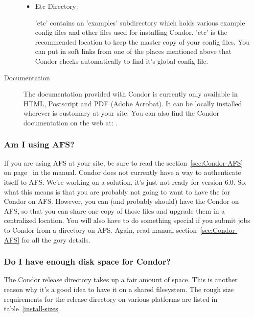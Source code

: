 \begin{description}
\begin{itemize}
     \item Etc Directory:

     'etc' contains an 'examples' subdirectory which holds various
     example config files and other files used for installing Condor.
     'etc' is the recommended location to keep the master copy of your
     config files.  You can put in soft links from one of the places
     mentioned above that Condor checks automatically to find it's
     global config file. 
\end{itemize}

\item[Documentation]

The documentation provided with Condor is currently only available in
HTML, Postscript and PDF (Adobe Acrobat).  It can be locally installed
wherever is customary at your site.  You can also find the Condor
documentation on the web at:
.

\end{description}

\subsubsection{ Am I using AFS? }

If you are using AFS at your site, be sure to read the
section~\ref{sec:Condor-AFS} on page~\pageref{sec:Condor-AFS} in the
manual.  Condor does not currently have a way to authenticate itself
to AFS.  We're working on a solution, it's just not ready for version
6.0.  So, what this means is that you are probably not going to want
to have the  for Condor on AFS.  However, you can
(and probably should) have the Condor  on AFS, so
that you can share one copy of those files and upgrade them in a
centralized location.  You will also have to do something special if
you submit jobs to Condor from a directory on AFS.  Again, read manual
section~\ref{sec:Condor-AFS} for all the gory details.

\subsubsection{ Do I have enough disk space for Condor? }

The Condor release directory takes up a fair amount of space.  This is
another reason why it's a good idea to have it on a shared
filesystem.  The rough size requirements for the release
directory on various platforms are listed in table~\ref{install-sizes}.

